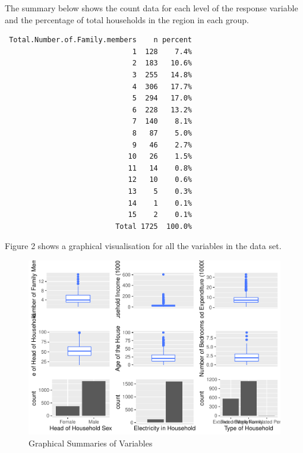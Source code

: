 \documentclass[
]{article}
\begin{document}
The summary below shows the count data for each level of the response
variable and the percentage of total households in the region in each
group.

\begin{verbatim}
 Total.Number.of.Family.members    n percent
                              1  128    7.4%
                              2  183   10.6%
                              3  255   14.8%
                              4  306   17.7%
                              5  294   17.0%
                              6  228   13.2%
                              7  140    8.1%
                              8   87    5.0%
                              9   46    2.7%
                             10   26    1.5%
                             11   14    0.8%
                             12   10    0.6%
                             13    5    0.3%
                             14    1    0.1%
                             15    2    0.1%
                          Total 1725  100.0%
\end{verbatim}

Figure 2 shows a graphical visualisation for all the variables in the
data set.

\begin{figure}[H]

{\centering \includegraphics[width=0.8\linewidth]{Group_01_Project2_demo_files/figure-latex/all summaries-1} 

}

\caption{Graphical Summaries of Variables}\label{fig:all summaries}
\end{figure}
\end{document}
